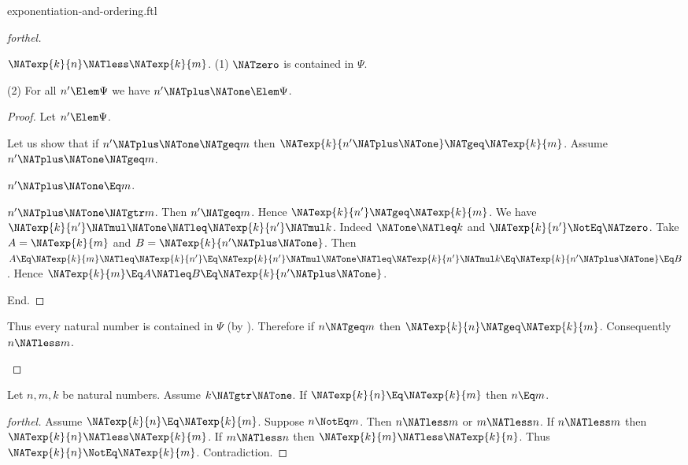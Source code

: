 \documentclass{stex}
\begin{document}
\begin{smodule}{exponentiation-and-ordering.ftl}
\begin{proof}[forthel]
\begin{case}{$\NATexp{k}{n} \NATless \NATexp{k}{m}$.}
    (1) $\NATzero$ is contained in $\Psi$.

    (2) For all $n' \Elem \Psi$ we have $n' \NATplus \NATone \Elem \Psi$.
    \begin{proof}
      Let $n' \Elem \Psi$.

      Let us show that if $n' \NATplus \NATone \NATgeq m$ then $\NATexp{k}{n' \NATplus \NATone} \NATgeq \NATexp{k}{m}$.
        Assume $n' \NATplus \NATone \NATgeq m$.

        \begin{case}{$n' \NATplus \NATone \Eq m$.} \end{case}

        \begin{case}{$n' \NATplus \NATone \NATgtr m$.}
          Then $n' \NATgeq m$.
          Hence $\NATexp{k}{n'} \NATgeq \NATexp{k}{m}$.
          We have $\NATexp{k}{n'} \NATmul \NATone \NATleq \NATexp{k}{n'} \NATmul k$.
          Indeed $\NATone \NATleq k$ and $\NATexp{k}{n'} \NotEq \NATzero$.
          Take $A = \NATexp{k}{m}$ and $B = \NATexp{k}{n' \NATplus \NATone}$. %
          Then $A
            \Eq \NATexp{k}{m}
            \NATleq \NATexp{k}{n'}
            \Eq \NATexp{k}{n'} \NATmul \NATone
            \NATleq \NATexp{k}{n'} \NATmul k
            \Eq \NATexp{k}{n' \NATplus \NATone}
            \Eq B$.
          Hence $\NATexp{k}{m} \Eq A \NATleq B \Eq \NATexp{k}{n' \NATplus \NATone}$.
        \end{case}
      End.
    \end{proof}

    Thus every natural number is contained in $\Psi$ (by ).
    Therefore if $n \NATgeq m$ then $\NATexp{k}{n} \NATgeq \NATexp{k}{m}$.
    Consequently $n \NATless m$.
  \end{case}
\end{proof}

\begin{corollary}[forthel]
  Let $n, m, k$ be natural numbers.
  Assume $k \NATgtr \NATone$.
  If $\NATexp{k}{n} \Eq \NATexp{k}{m}$ then $n \Eq m$.
\end{corollary}
\begin{proof}[forthel]
  Assume $\NATexp{k}{n} \Eq \NATexp{k}{m}$.
  Suppose $n \NotEq m$.
  Then $n \NATless m$ or $m \NATless n$.
  If $n \NATless m$ then $\NATexp{k}{n} \NATless \NATexp{k}{m}$.
  If $m \NATless n$ then $\NATexp{k}{m} \NATless \NATexp{k}{n}$.
  Thus $\NATexp{k}{n} \NotEq \NATexp{k}{m}$.
  Contradiction.
\end{proof}


\end{smodule}
\end{document}
